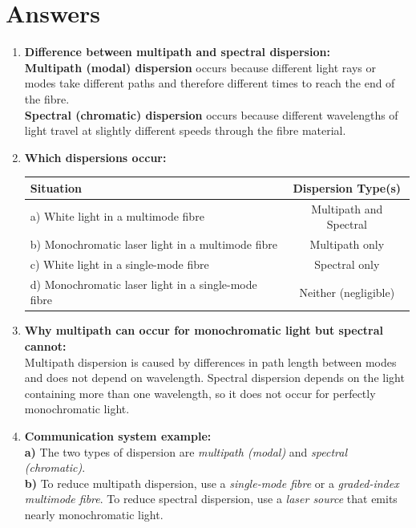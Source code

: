 \documentclass[a4paper,12pt]{article}
\begin{document}
\newpage
\section*{Answers}

\begin{enumerate}
  \item \textbf{Difference between multipath and spectral dispersion:}\\[4pt]
  \textbf{Multipath (modal) dispersion} occurs because different light rays or modes take different paths and therefore different times to reach the end of the fibre.\\
  \textbf{Spectral (chromatic) dispersion} occurs because different wavelengths of light travel at slightly different speeds through the fibre material.

  \item \textbf{Which dispersions occur:}\\[4pt]
  \begin{tabular}{|p{8cm}|c|}
    \hline
    \textbf{Situation} & \textbf{Dispersion Type(s)} \\
    \hline
    a) White light in a multimode fibre & Multipath and Spectral \\
    \hline
    b) Monochromatic laser light in a multimode fibre & Multipath only \\
    \hline
    c) White light in a single-mode fibre & Spectral only \\
    \hline
    d) Monochromatic laser light in a single-mode fibre & Neither (negligible) \\
    \hline
  \end{tabular}

  \item \textbf{Why multipath can occur for monochromatic light but spectral cannot:}\\[4pt]
  Multipath dispersion is caused by differences in path length between modes and does not depend on wavelength. Spectral dispersion depends on the light containing more than one wavelength, so it does not occur for perfectly monochromatic light.

  \item \textbf{Communication system example:}\\[4pt]
  \textbf{a)} The two types of dispersion are \textit{multipath (modal)} and \textit{spectral (chromatic)}.\\
  \textbf{b)} To reduce multipath dispersion, use a \textit{single-mode fibre} or a \textit{graded-index multimode fibre}. To reduce spectral dispersion, use a \textit{laser source} that emits nearly monochromatic light.
\end{enumerate}
\end{document}
